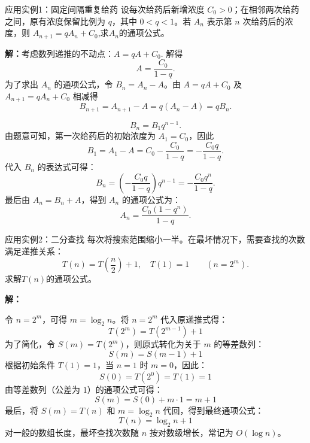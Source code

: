 \documentclass[aspectratio=169,10pt]{ctexbeamer}
\begin{document}
\begin{frame}
	 \footnotesize
  \begin{block}{应用实例1：固定间隔重复给药}
  	设每次给药后新增浓度 $C_0>0$；在相邻两次给药之间，原有浓度保留比例为 $q$，其中 $0<q<1$。若 $A_n$ 表示第 $n$ 次给药后的浓度，则
  	$
  	A_{n+1}=qA_n+C_0$,求$A_n$的通项公式。
  \end{block}
  \pause
  \scriptsize

   \textbf{解：}考虑数列递推的不动点：$A=qA+C_0.$
   解得
   \[
   A=\frac{C_0}{1-q}.
   \]
   为了求出 $A_n$ 的通项公式，令 $B_n=A_n-A$。由 $A=qA+C_0$ 及 $A_{n+1}=qA_n+C_0$ 相减得
   \[
   B_{n+1}=A_{n+1}-A=q(A_n-A)=qB_n.
   \]

   \[
   B_n=B_1 q^{n-1}.
   \]
   由题意可知，第一次给药后的初始浓度为 $A_1 = C_0$，因此
   \[
   B_1 = A_1 - A = C_0 - \frac{C_0}{1-q} = -\frac{C_0 q}{1-q}.
   \]
   代入 $B_n$ 的表达式可得：
   \[
   B_n = \left(-\frac{C_0 q}{1-q}\right) q^{n-1} = -\frac{C_0 q^n}{1-q}.
   \]
   最后由 $A_n = B_n + A$，得到 $A_n$ 的通项公式为：
   \[
   A_n = \frac{C_0(1-q^n)}{1-q}.
   \]

  
\end{frame}


\begin{frame}
	\footnotesize
	\begin{block}{应用实例2：二分查找}
	每次将搜索范围缩小一半。在最坏情况下，需要查找的次数满足递推关系：
	\[
	T(n) = T\left(\dfrac{n}{2}\right) + 1,\quad T(1) = 1\qquad(n=2^m).
	\]
	求解$T(n)$的通项公式。
	\end{block}
	\pause
	\scriptsize
	\textbf{解：}

		令 $n = 2^m$，可得 $m = \log_2 n$。将 $n=2^m$ 代入原递推式得：
		\[
		T(2^m) = T(2^{m-1}) + 1
		\]
		为了简化，令 $S(m) = T(2^m)$，则原式转化为关于 $m$ 的等差数列：
		\[
		S(m) = S(m-1) + 1
		\]
		根据初始条件 $T(1) = 1$，当 $n=1$ 时 $m=0$，因此：
		\[
		S(0) = T(2^0) = T(1) = 1
		\]
		 由等差数列（公差为 $1$）的通项公式可得：
	\[
			S(m) = S(0) + m \cdot 1 = m + 1
	\]
		 最后，将 $S(m) = T(n)$ 和 $m = \log_2 n$ 代回，得到最终通项公式：
		\[
		T(n) = \log_2 n + 1
		\]
对一般的数组长度，最坏查找次数随 $n$ 按对数级增长，常记为 \(O(\log n)\)。
\end{frame}
\end{document}
